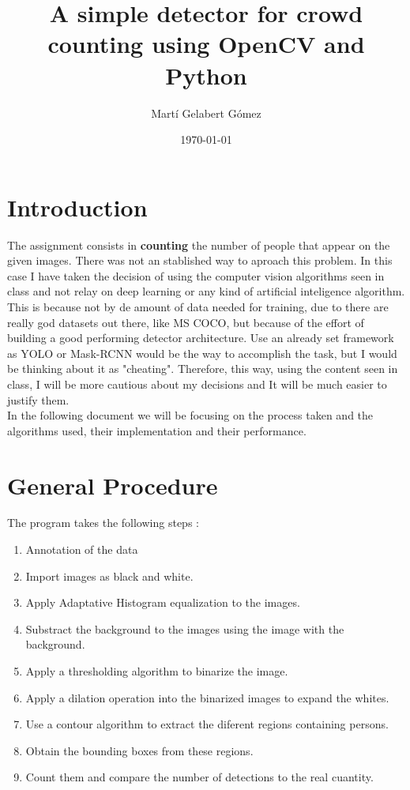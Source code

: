 \documentclass[11pt]{article}
\begin{document}
\title{A simple detector for crowd counting using OpenCV and Python}
\author{Martí Gelabert Gómez}
\date{\today}
\maketitle

\tableofcontents
\section{Introduction}
The assignment consists in \textbf{counting} the number of people that appear on the given images. There was not an stablished way to aproach this problem. In this case I have taken the decision of using the computer vision algorithms seen in class and not relay on deep learning or any kind of artificial inteligence algorithm. This is because not by de amount of data needed for training, due to there are really god datasets out there, like MS COCO, but because of the effort of building a good performing detector architecture. Use an already set framework as YOLO or Mask-RCNN would be the way to accomplish the task, but I would be thinking about it as "cheating". Therefore, this way, using the content seen in class, I will be more cautious about my decisions and It will be much easier to justify them.\\

In the following document  we will be focusing on the process taken and the algorithms used, their implementation and their performance.

\section{General Procedure}
The program takes the following steps :

\begin{enumerate}
  \item Annotation of the data
  \item Import images as black and white.
  \item Apply Adaptative Histogram equalization to the images.
  \item Substract the background to the images using the image with the background.
  \item Apply a thresholding algorithm to binarize the image.
  \item Apply a dilation operation into the binarized images to expand the whites.
  \item Use a contour algorithm to extract the diferent regions containing persons.
  \item Obtain the bounding boxes from these regions.
  \item Count them and compare the number of detections to the real cuantity.
\end{enumerate}
\end{document}
